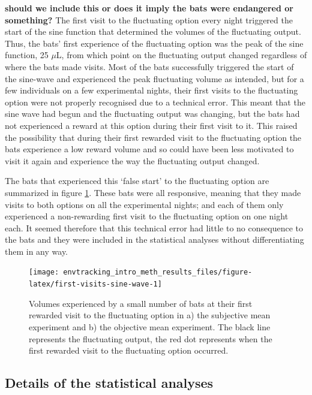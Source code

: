 \documentclass[
]{article}
\begin{document}
\textbf{should we include this or does it imply the bats were endangered or something?}
The first visit to the fluctuating option every night triggered the start of the sine function that determined the volumes of the fluctuating output. Thus, the bats' first experience of the fluctuating option was the peak of the sine function, 25 \(\mu\)L, from which point on the fluctuating output changed regardless of where the bats made visits. Most of the bats successfully triggered the start of the sine-wave and experienced the peak fluctuating volume as intended, but for a few individuals on a few experimental nights, their first visits to the fluctuating option were not properly recognised due to a technical error. This meant that the sine wave had begun and the fluctuating output was changing, but the bats had not experienced a reward at this option during their first visit to it. This raised the possibility that during their first rewarded visit to the fluctuating option the bats experience a low reward volume and so could have been less motivated to visit it again and experience the way the fluctuating output changed.

The bats that experienced this `false start' to the fluctuating option are summarized in figure \ref{fig:first-visits-sine-wave}. These bats were all responsive, meaning that they made visits to both options on all the experimental nights; and each of them only experienced a non-rewarding first visit to the fluctuating option on one night each. It seemed therefore that this technical error had little to no consequence to the bats and they were included in the statistical analyses without differentiating them in any way.



\begin{figure}[H]

{\centering \texttt{[image: envtracking\_intro\_meth\_results\_files/figure-latex/first-visits-sine-wave-1]} 

}

\caption{Volumes experienced by a small number of bats at their first rewarded visit to the fluctuating option in a) the subjective mean experiment and b) the objective mean experiment. The black line represents the fluctuating output, the red dot represents when the first rewarded visit to the fluctuating option occurred.}\label{fig:first-visits-sine-wave}
\end{figure}

\hypertarget{details-of-the-statistical-analyses}{%
\subsection{Details of the statistical analyses}\label{details-of-the-statistical-analyses}}
\end{document}
